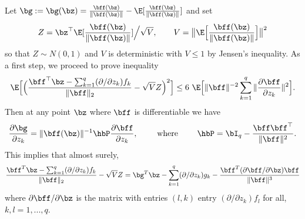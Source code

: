 \documentclass{colt2022} %
\renewenvironment{proof}[1][]
{
    \begin{newproof}
    \ifthenelse{\equal{#1}{}}{ }{\textbf{(#1) }}%
}{
    \end{newproof}
}
\numberwithin{equation}{section}
\begin{document}
\begin{proof}
    Let $ \bg := \bg(\bz) = \frac{\bff(\bz)}{\|\bff(\bz)\|} - \E[
    \frac{\bff(\bz)}{\|\bff(\bz)\|}
    ]$
    and set
    $$Z= \bz^\top \E[
        \frac{\bff(\bz)}{\|\bff(\bz)\|}
        ] \Big/ \sqrt V,
    \qquad
    V=\bigl\|\E\Bigl[
        \frac{\bff(\bz)}{\|\bff(\bz)\|}
    \Bigr]\bigr\|^2
    $$
    so that $Z\sim N(0,1)$ and $V$ is deterministic
    with $V\le 1$ by Jensen's inequality.
    As a first step, we proceed to prove inequality
    \begin{equation}
        \label{eq:6470}
    \E\Bigl[
    \Bigl(
        \frac{\bff^\top \bz -
        \sum_{k=1}^q(\partial/\partial z_k) f_k
        }{\|\bff\|_{2}}
        - \sqrt{V} Z
    \Bigr)^2
\Bigr]
    \le
    6 ~
    \E \Bigl[ \| \bff \|^{-2}\sum_{k=1}^q \| \frac{\partial \bff}{\partial z_k} \|^{2} \Bigr].
    \end{equation}
    Then at any point $\bz$ where $\bff$ is differentiable we have
    $$
        \frac{ \partial \bg }{ \partial z_k }
        = \|\bff(\bz)\|^{-1} \hbP 
        \frac{ \partial \bff }{ \partial z_k },
        \qquad
        \text{ where }
        \qquad
        \hbP = \bI_q - \frac{\bff \bff ^\top}{\| \bff \|^2}.
    $$
    This implies that almost surely,
    $$
        \frac{
            \bff^T \bz 
        -
        \sum_{k=1}^q(\partial/\partial z_k) f_k
    }{\| \bff \|_{2}}
    - \sqrt{V} Z
    =
    \bg ^T \bz -
    \sum_{k=1}^q(\partial/\partial z_k) g_k
    -
    \frac{\bff^T (\partial \bff / \partial \bz) \bff}{\|\bff\|^{3}}
     $$
    where $\partial \bff / \partial \bz$ is the matrix with entries
    $(l,k)$ entry 
    $(\partial/ \partial z_k  )  f_l$
    for all, $k,l=1,...,q$.



\end{proof}
\end{document}
